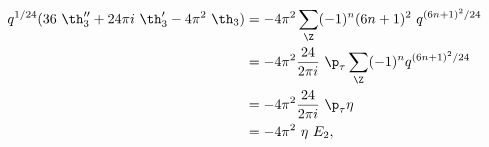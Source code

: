 \begin{equation} \label{eisenstein}
  \begin{split}
    q^{1/24} (36 ~\th_3'' + {24\pi i} ~\th_3' -4\pi^2 ~\th_3)
&= -4\pi^2 \sum_\Z (-1)^n (6n+1)^2 ~q^{(6n+1)^2 /24} \\
&= -4\pi^2 {24\over2\pi i} ~\p_\tau \sum_\Z (-1)^n q^{(6n+1)^2 /24} \\
&= -4\pi^2 {24\over2\pi i} ~\p_\tau \eta \\
&= -4\pi^2 ~\eta ~E_2,
  \end{split} 
\end{equation}

